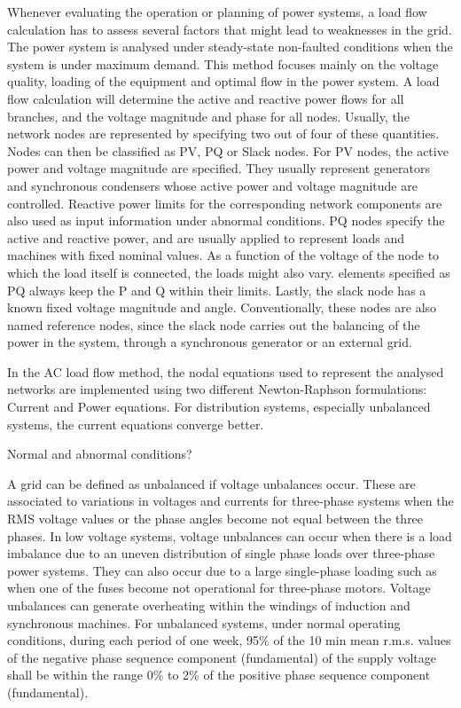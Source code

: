 Whenever evaluating the operation or planning of power systems, a load flow calculation has to assess several factors that might lead to weaknesses in the grid. The power system is analysed under steady-state non-faulted conditions when the system is under maximum demand. This method focuses mainly on the voltage quality, loading of the equipment and optimal flow in the power system. A load flow calculation will determine the active and reactive power flows for all branches, and the voltage magnitude and phase for all nodes. Usually, the network nodes are represented by specifying two out of four of these quantities. Nodes can then be classified as PV, PQ or Slack nodes. For PV nodes, the active power and voltage magnitude are specified. They usually represent generators and synchronous condensers whose active power and voltage magnitude are controlled. Reactive power limits for the corresponding network components are also used as input information under abnormal conditions. PQ nodes specify the active and reactive power, and are usually applied to represent loads and machines with fixed nominal values. As a function of the voltage of the node to which the load itself is connected, the loads might also vary. elements specified as PQ always keep the P and Q within their limits. Lastly, the slack node has a known fixed voltage magnitude and angle. Conventionally, these nodes are also named reference nodes, since the slack node carries out the balancing of the power in the system, through a synchronous generator or an external grid. 

In the AC load flow method, the nodal equations used to represent the analysed networks are implemented using two different Newton-Raphson formulations: Current and Power equations. For distribution systems, especially unbalanced systems, the current equations converge better. %

Normal and abnormal conditions? 

A grid can be defined as unbalanced if voltage unbalances occur. These are associated to variations in voltages and currents for three-phase systems when the RMS voltage values or the phase angles become not equal between the three phases. In low voltage systems, voltage unbalances can occur when there is a load imbalance due to an uneven distribution of single phase loads over three-phase power systems. They can also occur due to a large single-phase loading such as when one of the fuses become not operational for three-phase motors. Voltage unbalances can generate overheating within the windings of induction and synchronous machines. %
For unbalanced systems, under normal operating conditions, during each period of one week, 95\% of the 10 min mean r.m.s. values of the negative phase sequence component (fundamental) of the supply voltage shall be within the range 0\% to 2\% of the positive phase sequence component (fundamental). %

